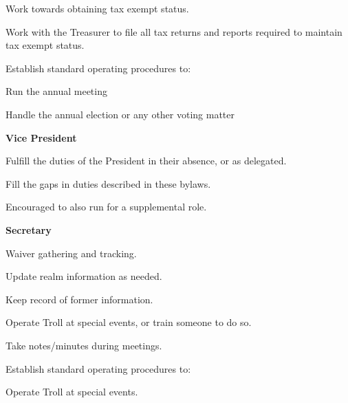 \documentclass[12pt]{article}
\begin{document}
\begin{level}
\begin{level}
\begin{level}
            \item Work towards obtaining tax exempt status.
            \item Work with the Treasurer to file all tax returns and reports required to maintain tax exempt status.
            \item Establish standard operating procedures to:
            \begin{level}
                \item Run the annual meeting
                \item Handle the annual election or any other voting matter
            \end{level}
        \end{level}
        \item \textbf{Vice President}
        \begin{level}
            \item Fulfill the duties of the President in their absence, or as delegated.
            \item Fill the gaps in duties described in these bylaws.
            \item Encouraged to also run for a supplemental role.
        \end{level}
        \item \textbf{Secretary}
        \begin{level}
            \item Waiver gathering and tracking.
            \item Update realm information as needed.
            \item Keep record of former information.
            \item Operate Troll at special events, or train someone to do so.
            \begin{level}
                \item {}
            \end{level}
            \item Take notes/minutes during meetings.
            \item {}
            \item Establish standard operating procedures to:
            \begin{level}
                \item Operate Troll at special events.

\end{level}
\end{level}
\end{level}
\end{level}
\end{document}
